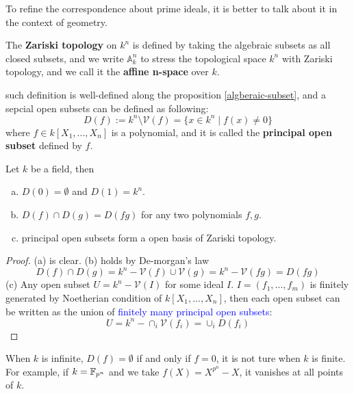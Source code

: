 To refine the correspondence about prime ideals, it is better to talk about it in the context of geometry.

\begin{colordefinition}
    The \textbf{Zariski topology} on \(k^n\) is defined by taking the algebraic subsets as all closed subsets, and we write \(\mathbb{A}_k^n\) to stress the topological space \(k^n\) with Zariski topology, and we call it the \textbf{affine n-space} over \(k\).
\end{colordefinition}

such definition is well-defined along the proposition \ref{algberaic-subset}, and a sepcial open subsets can be defined as following:
    \[D(f) := k^n \setminus \mathcal{V}(f) = \{x \in k^n \mid f(x) \neq 0\}\]
where \(f \in k[X_1,...,X_n]\) is a polynomial, and it is called the \textbf{principal open subset} defined by \(f\).

\begin{proposition} \label{principal-open}
    Let \(k\) be a field, then 
    \begin{enumerate}[(a)]
        \item \(D(0) = \emptyset\) and \(D(1) = k^n\).
        \item \(D(f) \cap D(g) = D(fg)\) for any two polynomials \(f,g\).
        \item principal open subsets form a open basis of Zariski topology.
    \end{enumerate}
\end{proposition}

\begin{proof}
    (a) is clear. (b) holds by De-morgan's law
    \[D(f) \cap D(g) = k^n - \mathcal{V}(f) \cup \mathcal{V}(g) = k^n - \mathcal{V}(fg) = D(fg)\]
    (c) Any open subset \(U = k^n - \mathcal{V}(I)\) for some ideal \(I\). \(I = (f_1,\dots,f_m)\) is finitely generated by Noetherian condition of \(k[X_1,...,X_n]\), then each open subset can be written as the union of \textcolor{blue}{finitely many principal open subsets}:
    \[U = k^n - \cap_{i} \mathcal{V}(f_i) = \cup_i D(f_i)\]
\end{proof}

\begin{remark}
    When \(k\) is infinite, \(D(f) = \emptyset\) if and only if \(f = 0\), it is not ture when \(k\) is finite. For example, if \(k = \mathbb{F}_{p^n}\) and we take \(f(X) = X^{p^n} - X\), it vanishes at all points of \(k\).
\end{remark}

